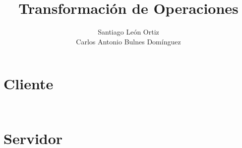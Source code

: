 \documentclass[12pt]{article}
\title{Transformación de Operaciones}
\author{Santiago León Ortiz \\ Carlos Antonio Bulnes Domínguez}
\begin{document}
\maketitle

\section{Cliente}

\inputminted[frame=lines, linenos, mathescape, breaklines=true, tabsize=2]{c}{client/main.cpp}
\inputminted[frame=lines, linenos, mathescape, breaklines=true, tabsize=2]{c}{client/editor_client.cpp}

\section{Servidor}

\inputminted[frame=lines, linenos, mathescape, breaklines=true, tabsize=2]{c}{server/server_main.cpp}
\inputminted[frame=lines, linenos, mathescape, breaklines=true, tabsize=2]{c}{server/server.cpp}
\inputminted[frame=lines, linenos, mathescape, breaklines=true, tabsize=2]{c}{server/mythread.cpp}
\end{document}
